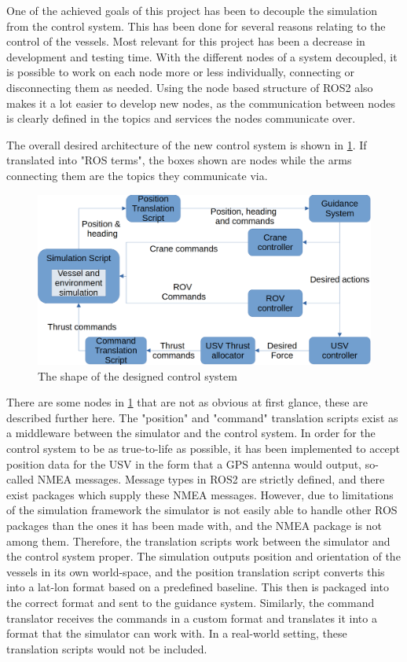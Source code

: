 \documentclass[class=article, crop=false]{standalone}
\begin{document}
One of the achieved goals of this project has been to decouple the simulation from the control system. This has been done for several reasons relating to the control of the vessels. Most relevant for this project has been a decrease in development and testing time. With the different nodes of a system decoupled, it is possible to work on each node more or less individually, connecting or disconnecting them as needed. Using the node based structure of ROS2 also makes it a lot easier to develop new nodes, as the communication between nodes is clearly defined in the topics and services the nodes communicate over.

The overall desired architecture of the new control system is shown in \cref{fig:architecture}. If translated into "ROS terms", the boxes shown are nodes while the arms connecting them are the topics they communicate via.

\begin{figure}
    \centering
    \includegraphics{control_system_graph}
    \caption{The shape of the designed control system}
    \label{fig:architecture}
\end{figure}

There are some nodes in \cref{fig:architecture} that are not as obvious at first glance, these are described further here. The "position" and "command" translation scripts exist as a middleware between the simulator and the control system. In order for the control system to be as true-to-life as possible, it has been implemented to accept position data for the USV in the form that a GPS antenna would output, so-called NMEA messages. Message types in ROS2 are strictly defined, and there exist packages which supply these NMEA messages. However, due to limitations of the simulation framework the simulator is not easily able to handle other ROS packages than the ones it has been made with, and the NMEA package is not among them. Therefore, the translation scripts work between the simulator and the control system proper. The simulation outputs position and orientation of the vessels in its own world-space, and the position translation script converts this into a lat-lon format based on a predefined baseline. This then is packaged into the correct format and sent to the guidance system. Similarly, the command translator receives the commands in a custom format and translates it into a format that the simulator can work with. In a real-world setting, these translation scripts would not be included.
\end{document}
